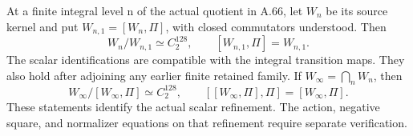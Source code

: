At a finite integral level n of the actual quotient in A.66, let
\(W_n\) be its source kernel and put
\(W_{n,1}=[W_n,\Pi]\), with closed commutators understood.
Then
\[
 W_n/W_{n,1}\simeq C_2^{128},\qquad
 [W_{n,1},\Pi]=W_{n,1}.
 \tag{A.68.1}
\]
The scalar identifications are compatible with the integral transition
maps. They also hold after adjoining any earlier finite retained family.
If \(W_\infty=\bigcap_nW_n\), then
\[
 W_\infty/[W_\infty,\Pi]\simeq C_2^{128},\qquad
 [[W_\infty,\Pi],\Pi]=[W_\infty,\Pi].
 \tag{A.68.2}
\]
These statements identify the actual scalar refinement. The action,
negative square, and normalizer equations on that refinement require
separate verification.

